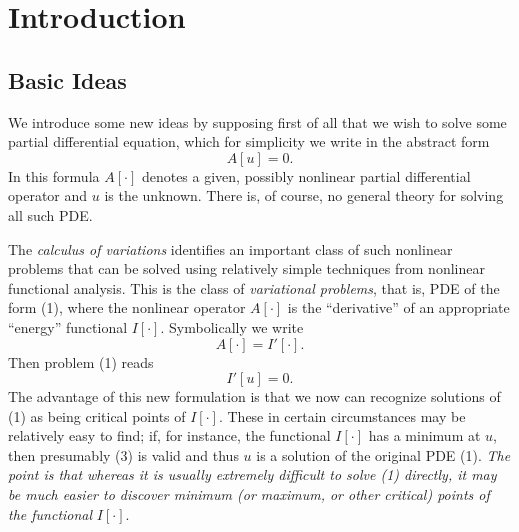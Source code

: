 %


\section{Introduction}
\label{sec:calculus-of-variations-introduction}

\subsection{Basic Ideas}
\label{sec:basic-ideas-calculus-of-variations}

We introduce some new ideas by supposing first of all that we wish to solve some partial differential equation, which for simplicity we write in the abstract form
\[
A[u] = 0.
\tag{1}
\]
In this formula $A[\cdot]$ denotes a given, possibly nonlinear partial differential operator and $u$ is the unknown. There is, of course, no general theory for solving all such PDE.

The \textit{calculus of variations} identifies an important class of such nonlinear problems that can be solved using relatively simple techniques from nonlinear functional analysis. This is the class of \textit{variational problems}, that is, PDE of the form (1), where the nonlinear operator $A[\cdot]$ is the ``derivative'' of an appropriate ``energy'' functional $I[\cdot]$. Symbolically we write
\[
A[\cdot] = I'[\cdot].
\tag{2}
\]
Then problem (1) reads
\[
I'[u] = 0.
\tag{3}
\]
The advantage of this new formulation is that we now can recognize solutions of (1) as being critical points of $I[\cdot]$. These in certain circumstances may be relatively easy to find; if, for instance, the functional $I[\cdot]$ has a minimum at $u$, then presumably (3) is valid and thus $u$ is a solution of the original PDE (1). \textit{The point is that whereas it is usually extremely difficult to solve (1) directly, it may be much easier to discover minimum (or maximum, or other critical) points of the functional} $I[\cdot]$.

